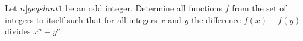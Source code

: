 \documentclass[preview]{standalone}
\begin{document}
\begin{center}
Let $n ]geqslant 1$ be an odd integer. Determine all functions $f$ from the set of integers to itself such that for all integers $x$ and $y$ the difference $f(x)-f(y)$ divides $x^{n}-y^{n}$.
\end{center}
\end{document}
